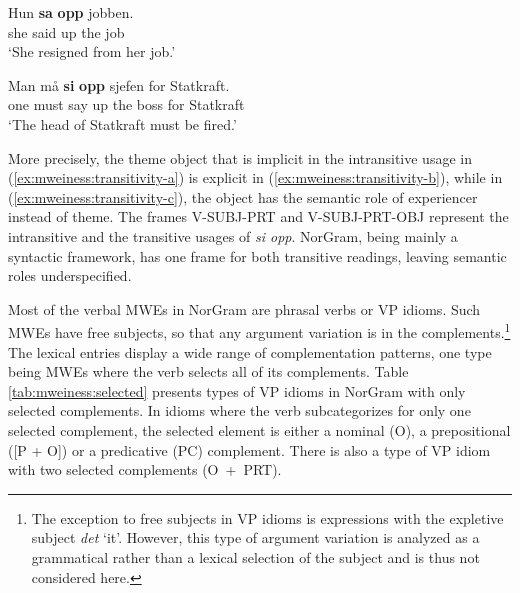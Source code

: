\documentclass[output=paper]{langsci/langscibook}
\begin{document}
\ea \label{ex:mweiness:transitivity-b} \gll Hun \textbf{sa} \textbf{opp} jobben. \\
     she said up {the job} \\
\glt `She resigned from her job.' \\
\z

\ea \label{ex:mweiness:transitivity-c} \gll Man må \textbf{si} \textbf{opp} sjefen for Statkraft. \\
      one must say up {the boss} for Statkraft \\
\glt `The head of Statkraft must be fired.' 
\z

More precisely, the theme object that is implicit in the intransitive usage in (\ref{ex:mweiness:transitivity-a}) is explicit in (\ref{ex:mweiness:transitivity-b}), while in (\ref{ex:mweiness:transitivity-c}), the object has the semantic role of experiencer instead of theme.
The frames V-SUBJ-PRT and V-SUBJ-PRT-OBJ represent the intransitive and the transitive usages of \emph{si opp}.
NorGram, being mainly a syntactic framework, has one frame for both transitive readings, leaving semantic roles underspecified. 

Most of the verbal MWEs in NorGram are phrasal verbs or VP idioms.
Such MWEs have free subjects, so that any argument variation is in the complements.\footnote{The exception to free subjects in VP idioms is expressions with the expletive subject \emph{det} `it'. However, this type of argument variation is analyzed as a grammatical rather than a lexical selection of the subject and is thus not considered here.}
The lexical entries display a wide range of complementation patterns, one type being MWEs where the verb selects all of its complements. 
Table \ref{tab:mweiness:selected} presents types of VP idioms in NorGram with only selected complements. 
In idioms where the verb subcategorizes for only one selected complement, the selected element is either a nominal (O), a prepositional ([P + O]) or a predicative (PC) complement. 
There is also a type of VP idiom with two selected complements (O~+~PRT).
\end{document}
